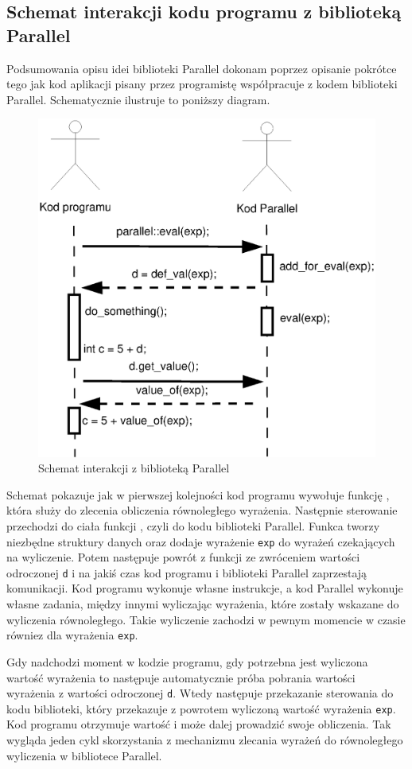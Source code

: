 \subsection{Schemat interakcji kodu programu z biblioteką Parallel}

  Podsumowania opisu idei biblioteki Parallel dokonam poprzez opisanie pokrótce tego jak kod aplikacji pisany przez programistę współpracuje z kodem biblioteki Parallel.
  Schematycznie ilustruje to poniższy diagram.
\begin{figure}[h!]
 \includegraphics[width=\textwidth]{interaction.eps}
 \caption{Schemat interakcji z biblioteką Parallel}
\end{figure}

  Schemat pokazuje jak w pierwszej kolejności kod programu wywołuje funkcję \feval, która służy do zlecenia obliczenia równoległego wyrażenia.
  Następnie sterowanie przechodzi do ciała funkcji \feval, czyli do kodu biblioteki Parallel.
  Funkca \feval tworzy niezbędne struktury danych oraz dodaje wyrażenie \verb|exp| do wyrażeń czekających na wyliczenie.
  Potem następuje powrót z funkcji \feval ze zwróceniem wartości odroczonej \verb|d| i na jakiś czas kod programu i biblioteki Parallel zaprzestają komunikacji.
  Kod programu wykonuje własne instrukcje, a kod Parallel wykonuje własne zadania, między innymi wyliczając wyrażenia, które zostały wskazane do wyliczenia równoległego.
  Takie wyliczenie zachodzi w pewnym momencie w czasie równiez dla wyrażenia \verb|exp|.
  
  Gdy nadchodzi moment w kodzie programu, gdy potrzebna jest wyliczona wartość wyrażenia to następuje automatycznie próba pobrania wartości wyrażenia z wartości odroczonej \verb|d|.
  Wtedy następuje przekazanie sterowania do kodu biblioteki, który przekazuje z powrotem wyliczoną wartość wyrażenia \verb|exp|.
  Kod programu otrzymuje wartość i może dalej prowadzić swoje obliczenia.
  Tak wygląda jeden cykl skorzystania z mechanizmu zlecania wyrażeń do równoległego wyliczenia w bibliotece Parallel.
  